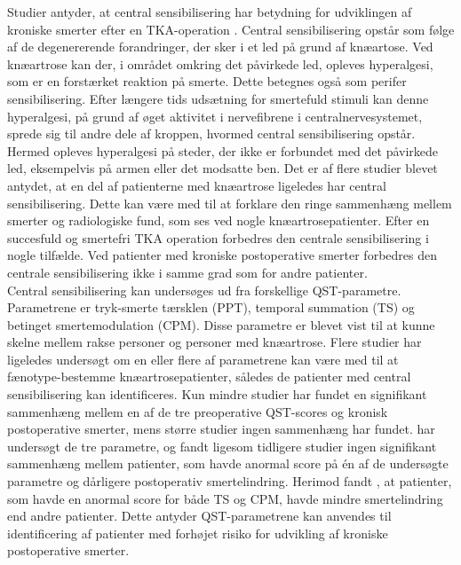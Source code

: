Studier antyder, at central sensibilisering har betydning for udviklingen af kroniske smerter efter en TKA-operation \citep{Suokas2012}. Central sensibilisering opstår som følge af de degenererende forandringer, der sker i et led på grund af knæartose. Ved knæartrose kan der, i området omkring det påvirkede led, opleves hyperalgesi, som er en forstærket reaktion på smerte. Dette betegnes også som perifer sensibilisering. \citep{Arendt-Nielsen2015} Efter længere tids udsætning for smertefuld stimuli kan denne hyperalgesi, på grund af øget aktivitet i nervefibrene i centralnervesystemet, sprede sig til andre dele af kroppen, hvormed central sensibilisering opstår. Hermed opleves hyperalgesi på steder, der ikke er forbundet med det påvirkede led, eksempelvis på armen eller det modsatte ben. Det er af flere studier blevet antydet, at en del af patienterne med knæartrose ligeledes har central sensibilisering. Dette kan være med til at forklare den ringe sammenhæng mellem smerter og radiologiske fund, som ses ved nogle knæartrosepatienter. \citep{Leary2016} Efter en succesfuld og smertefri TKA operation forbedres den centrale sensibilisering i nogle tilfælde. Ved patienter med kroniske postoperative smerter forbedres den centrale sensibilisering ikke i samme grad som for andre patienter. \citep{Arendt-Nielsen2015} \\
Central sensibilisering kan undersøges ud fra forskellige QST-parametre. Parametrene er tryk-smerte tærsklen (PPT), temporal summation (TS) og betinget smertemodulation (CPM). Disse parametre er blevet vist til at kunne skelne mellem rakse personer og personer med knæartrose. \citep{Arendt-Nielsen2015} Flere studier har ligeledes undersøgt om en eller flere af parametrene kan være med til at fænotype-bestemme knæartrosepatienter, således de patienter med central sensibilisering kan identificeres. \citep{Leary2016} \citep{Wylde2015b} Kun mindre studier har fundet en signifikant sammenhæng mellem en af de tre preoperative QST-scores og kronisk postoperative smerter, mens større studier ingen sammenhæng har fundet. \citep{Leary2016}  har undersøgt de tre parametre, og fandt ligesom tidligere studier ingen signifikant sammenhæng mellem patienter, som havde anormal score på én af de undersøgte parametre og dårligere postoperativ smertelindring. Herimod fandt , at patienter, som havde en anormal score for både TS og CPM, havde mindre smertelindring end andre patienter. Dette antyder QST-parametrene kan anvendes til identificering af patienter med forhøjet risiko for udvikling af kroniske postoperative smerter. 

